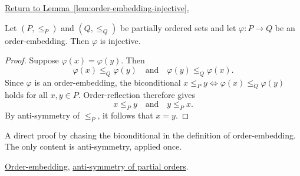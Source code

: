 
\newpage
{}
\label{prf:order-embedding-injective}

\begin{remark*}[Return]
\hyperref[lem:order-embedding-injective]{Return to Lemma~\ref*{lem:order-embedding-injective}.}
\end{remark*}

\begin{theorem*}
Let $(P, \leq_P)$ and $(Q, \leq_Q)$ be partially ordered sets and let
$\varphi : P \to Q$ be an order-embedding.  Then $\varphi$ is injective.
\end{theorem*}

\begin{proof}[Proof]
Suppose $\varphi(x) = \varphi(y)$.  Then
\[
\varphi(x) \leq_Q \varphi(y) \quad\text{and}\quad \varphi(y) \leq_Q \varphi(x).
\]
Since $\varphi$ is an order-embedding, the biconditional
$x \leq_P y \Longleftrightarrow \varphi(x) \leq_Q \varphi(y)$ holds for
all $x, y \in P$.  Order-reflection therefore gives
\[
x \leq_P y \quad\text{and}\quad y \leq_P x.
\]
By anti-symmetry of $\leq_P$, it follows that $x = y$.
\end{proof}

\begin{remark*}
A direct proof by chasing the biconditional in the definition of
order-embedding.  The only content is anti-symmetry, applied once.
\end{remark*}

\begin{remark*}[Dependencies]
\hyperref[def:order-embedding]{Order-embedding},
\hyperref[def:partial-order]{anti-symmetry of partial orders}.
\end{remark*}
